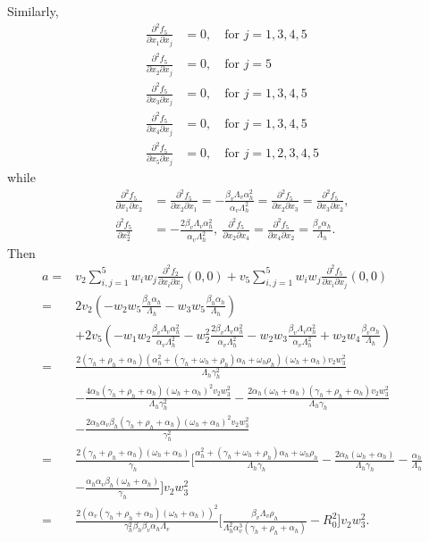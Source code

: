 \documentclass[review]{elsarticle}
\begin{document}
 Similarly,
\begin{align*}
\frac{\partial^2 f_5}{\partial x_1\partial x_j} & =0,\quad\mbox{for } j=1,3,4,5\\
\frac{\partial^2 f_5}{\partial x_2\partial x_j} & =0,\quad\mbox{for } j=5\\
\frac{\partial^2 f_5}{\partial x_3\partial x_j} & =0,\quad\mbox{for } j=1,3,4,5\\
\frac{\partial^2 f_5}{\partial x_4\partial x_j} & =0,\quad\mbox{for } j=1,3,4,5\\
\frac{\partial^2 f_5}{\partial x_5\partial x_j} & =0,\quad\mbox{for } j=1,2,3,4,5
\end{align*}
while
\begin{align*}
\frac{\partial^2 f_5}{\partial x_1\partial x_2}&=\frac{\partial^2 f_5}{\partial x_2\partial x_1}
 =-\frac{\beta_v\Lambda_v\alpha_h^2}{\alpha_v\Lambda_h^2}=\frac{\partial^2 f_5}{\partial x_2\partial x_3}=\frac{\partial^2 f_5}{\partial x_3\partial x_2},\\
\frac{\partial^2 f_5}{\partial x_2^2}&=-\frac{2\beta_v\Lambda_v\alpha_h^2}{\alpha_v\Lambda_h^2},\
\frac{\partial^2 f_5}{\partial x_2\partial x_4}=\frac{\partial^2 f_5}{\partial x_4\partial x_2} =\frac{\beta_v\alpha_h}{\Lambda_h}.
\end{align*}
Then
\begin{align*}
a=&v_2\sum_{i,j=1}^{5}w_iw_j\frac{\partial^2f_2}{\partial x_i \partial x_j}(0,0)
+v_5\sum_{i,j=1}^{5}w_iw_j\frac{\partial^2f_5}{\partial x_i \partial x_j}(0,0)\\
=&2v_2\left(-w_2w_5\frac{\beta_h\alpha_h}{\Lambda_h}-w_3w_5\frac{\beta_h\alpha_h}{\Lambda_h}\right)\\
&+2v_5\left(-w_1w_2\frac{\beta_v\Lambda_v\alpha_h^2}{\alpha_v\Lambda_h^2}-w_2^2\frac{2\beta_v\Lambda_v\alpha_h^2}{\alpha_v\Lambda_h^2}
-w_2w_3\frac{\beta_v\Lambda_v\alpha_h^2}{\alpha_v\Lambda_h^2}+w_2w_4\frac{\beta_v\alpha_h}{\Lambda_h}\right)\\
=& \frac{2(\gamma_h+\rho_h+\alpha_h)(\alpha_h^2+(\gamma_h+\omega_h+\rho_h)\alpha_h+\omega_h\rho_h)(\omega_h+\alpha_h)v_2w_3^2}{
\Lambda_h\gamma_h^2}\\
&-\frac{4\alpha_h(\gamma_h+\rho_h+\alpha_h)(\omega_h+\alpha_h)^2v_2w_3^2}{\Lambda_h\gamma_h^2}-\frac{2\alpha_h(\omega_h+\alpha_h)
(\gamma_h+\rho_h+\alpha_h)v_2w_3^2}{\Lambda_h\gamma_h}\\
&-\frac{2\alpha_h\alpha_v\beta_h(\gamma_h+\rho_h+\alpha_h)(\omega_h+\alpha_h)^2v_2w_3^2}{\gamma_h^2}\\
=&\frac{2(\gamma_h+\rho_h+\alpha_h)(\omega_h+\alpha_h)}{\gamma_h}\biggl[\frac{\alpha_h^2+(\gamma_h+\omega_h+\rho_h)
\alpha_h+\omega_h\rho_h}{\Lambda_h\gamma_h} -\frac{2\alpha_h(\omega_h+\alpha_h)}{\Lambda_h\gamma_h}-\frac{\alpha_h}{\Lambda_h}\\
&-\frac{\alpha_h\alpha_v\beta_h(\omega_h+\alpha_h)}{\gamma_h}\biggl]v_2w_3^2\\
=& \frac{2(\alpha_v(\gamma_h+\rho_h+\alpha_h)(\omega_h+\alpha_h))^2}{\gamma_h^2\beta_h\beta_v\alpha_h\Lambda_v} \biggl[ \frac{\beta_v\Lambda_v\rho_h}{\Lambda_h^2\alpha_v^3(\gamma_h+\rho_h+\alpha_h)}-R_0^2\biggl]v_2w_3^2.
\end{align*}
\end{document}
